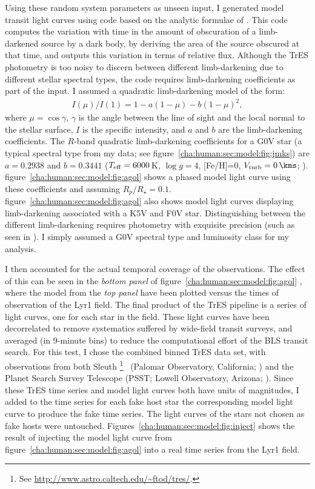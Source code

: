 Using these random system parameters as unseen input, I generated model transit light curves using code based on the analytic formulae of \citet{Mandel_Agol:apjl:2002a}.
This code computes the variation with time in the amount of obscuration of a limb-darkened source by a dark body, by deriving the area of the source obscured at that time, and outputs this variation in terms of relative flux.
Although the TrES photometry is too noisy to discern between different limb-darkening due to different stellar spectral types, the code requires limb-darkening coefficients as part of the input.
I assumed a quadratic limb-darkening model of the form: 
\begin{eqnarray*}
\label{cha:human:sec:model:eqn:limb}
I(\mu)/I(1) = 1-a(1-\mu)-b(1-\mu)^2, 
\end{eqnarray*}
where $\mu=\cos{\gamma}$, $\gamma$ is the angle between the line of sight and the local normal to the stellar surface, $I$ is the specific intensity, and $a$ and $b$ are the limb-darkening coefficients.
The $R$-band quadratic limb-darkening coefficients for a G0V star (a typical spectral type from my data; see figure~\ref{cha:human:sec:model:fig:jmks}) are $a=0.2938$ and $b=0.3441$ ($T_{\rm eff}=6000$\,K, $\log{g}=4$, [Fe/H]=0, $V_{\rm turb}=0\,\kms$; \citealt{Claret:aa:2000a}). 
figure~\ref{cha:human:sec:model:fig:agol} %
shows a phased model light curve using these coefficients and assuming $R_{p}/R_{\star}=0.1$. 
figure~\ref{cha:human:sec:model:fig:agol} %
also shows model light curves displaying limb-darkening associated with a K5V and F0V star. 
Distinguishing between the different limb-darkening requires photometry with exquisite precision (such as seen in \citealt{Brown_Charbonneau_Gilliland:apj:2001a}).
I simply assumed a G0V spectral type and luminosity class for my analysis.

I then accounted for the actual temporal coverage of the observations. 
The effect of this can be seen in the {\it bottom panel} of figure~\ref{cha:human:sec:model:fig:agol}%
, where the model from the {\it top panel} have been plotted versus the times of observation of the Lyr1 field.
The final product of the TrES pipeline is a series of light curves, one for each star in the field. 
These light curves have been decorrelated to remove systematics suffered by wide-field transit surveys, and averaged (in 9-minute bins) to reduce the computational effort of the BLS transit search.
For this test, I chose the combined binned TrES data set, with observations from both Sleuth%
\footnote{See \url{http://www.astro.caltech.edu/\~ftod/tres/}.}%
\ (Palomar Observatory, California; \citealt{ODonovan_Charbonneau_Kotredes:AIP:2004a}) and the Planet Search Survey Telescope (PSST;  Lowell Observatory, Arizona; \citealt{Dunham_Mandushev_Taylor:pasp:2004a}). 
Since these TrES time series and model light curves both have units of magnitudes, I added to the time series for each fake host star the corresponding model light curve to produce the fake time series. 
The light curves of the stars not chosen as fake hosts were untouched. 
Figures~\ref{cha:human:sec:model:fig:inject} shows the result of injecting the model light curve from figure~\ref{cha:human:sec:model:fig:agol} %
into a real time series from the Lyr1 field.


